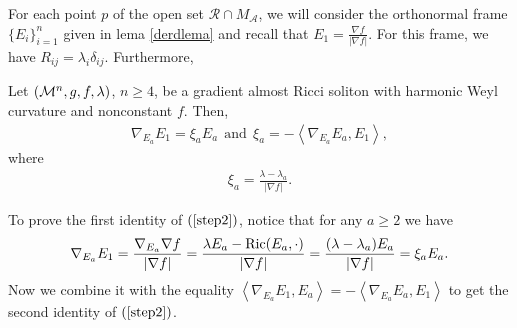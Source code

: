 
For each point $p$ of the open set $\mathcal{R}\cap M_{\mathcal{A}}$, we will consider the orthonormal frame $\{E_{i}\}_{i=1}^n$ given in lema \ref{derdlema} and recall that $E_{1}=\frac{\nabla f}{|\nabla f|}$. For this frame, we have $R_{ij}=\lambda_{i}\delta_{ij}$. Furthermore,
\begin{lema}\label{nablaframe}
	Let $(\mathcal{M}^n,g,f,\lambda)$, $n\geq4$, be a gradient almost Ricci soliton with harmonic Weyl curvature and nonconstant $f$. Then,
	\begin{align}\label{step2}
		 \nabla_{E_{a}}E_{1}=\xi_{a}E_{a}\ \ \text{and}\ \ \xi_{a}=-\left\langle\nabla_{E_{a}}E_{a},E_{1}\right\rangle,
	\end{align}
	where
	\begin{align}\label{step1}
		\xi_{a}=\frac{\lambda-\lambda_{a}}{|\nabla f|}.
	\end{align}
\end{lema}
\begin{demm}
To prove the first identity of $(\ref{step2})$, notice that for any $a\geq2$ we have
\begin{align}\label{comp1}
	\begin{split}
	\nabla_{E_{a}}E_{1}=\frac{\nabla_{E_{a}}\nabla f}{|\nabla f|}=\frac{\lambda E_{a}-\mathrm{Ric}(E_{a},\cdot)}{|\nabla f|}=\frac{(\lambda-\lambda_{a})E_{a}}{|\nabla f|}=\xi_{a}E_{a}.
	\end{split}
\end{align}
Now we combine it with the equality $\left\langle\nabla_{E_{a}}E_{1},E_{a}\right\rangle=-\left\langle\nabla_{E_{a}}E_{a},E_{1}\right\rangle$ to get the second identity of $(\ref{step2})$. \\

\end{demm}




